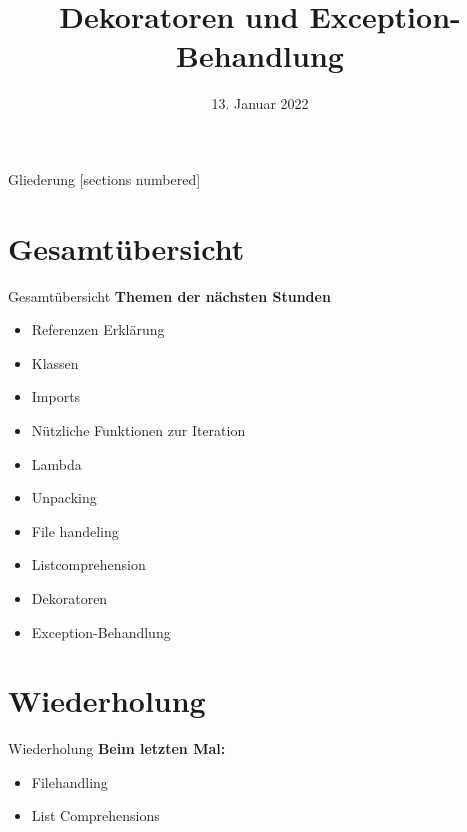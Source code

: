 



\title{Dekoratoren und Exception-Behandlung}
\date{13. Januar 2022}


	
\maketitle

\begin{frame}{Gliederung}
	[sections numbered]
	\tableofcontents
\end{frame}

\section*{Gesamtübersicht}
\begin{frame}{Gesamtübersicht}
	\textbf{Themen der nächsten Stunden}
	\begin{itemize}
		\item Referenzen Erklärung
		\item  Klassen
		\item Imports
		\item Nützliche Funktionen zur Iteration
		\item Lambda
		\item Unpacking
		\item File handeling
		\item Listcomprehension
		\item \alert{Dekoratoren}
		\item \alert{Exception-Behandlung}
	\end{itemize}
\end{frame}

\section{Wiederholung}
\begin{frame}{Wiederholung}
	\textbf{Beim letzten Mal:}
	\begin{itemize}
		\item Filehandling
		
		\item List Comprehensions
		
	\end{itemize}	
\end{frame}

